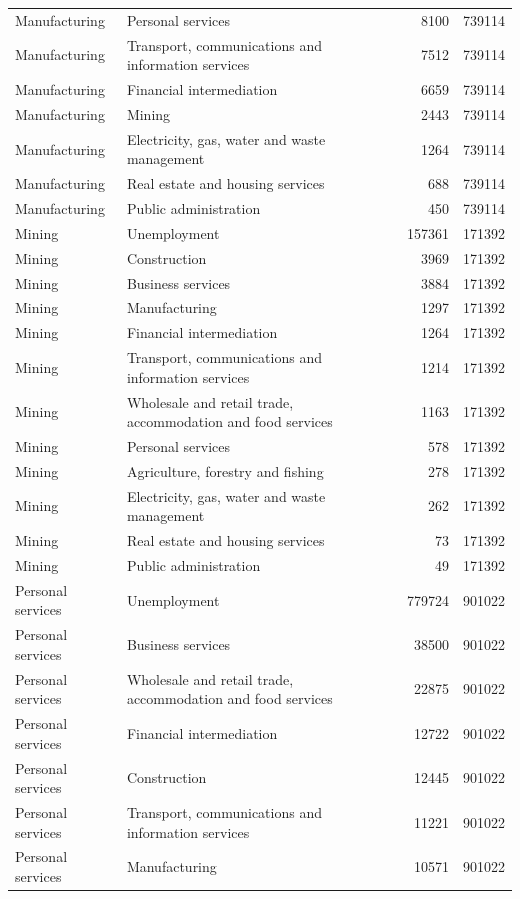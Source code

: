 \begin{longtable}{llrr}
Manufacturing & Personal services & 8100 & 739114 \\
Manufacturing & Transport, communications and information services & 7512 & 739114 \\
Manufacturing & Financial intermediation & 6659 & 739114 \\
Manufacturing & Mining & 2443 & 739114 \\
Manufacturing & Electricity, gas, water and waste management & 1264 & 739114 \\
Manufacturing & Real estate and housing services & 688 & 739114 \\
Manufacturing & Public administration & 450 & 739114 \\
Mining & Unemployment & 157361 & 171392 \\
Mining & Construction & 3969 & 171392 \\
Mining & Business services & 3884 & 171392 \\
Mining & Manufacturing & 1297 & 171392 \\
Mining & Financial intermediation & 1264 & 171392 \\
Mining & Transport, communications and information services & 1214 & 171392 \\
Mining & Wholesale and retail trade, accommodation and food services & 1163 & 171392 \\
Mining & Personal services & 578 & 171392 \\
Mining & Agriculture, forestry and fishing & 278 & 171392 \\
Mining & Electricity, gas, water and waste management & 262 & 171392 \\
Mining & Real estate and housing services & 73 & 171392 \\
Mining & Public administration & 49 & 171392 \\
Personal services & Unemployment & 779724 & 901022 \\
Personal services & Business services & 38500 & 901022 \\
Personal services & Wholesale and retail trade, accommodation and food services & 22875 & 901022 \\
Personal services & Financial intermediation & 12722 & 901022 \\
Personal services & Construction & 12445 & 901022 \\
Personal services & Transport, communications and information services & 11221 & 901022 \\
Personal services & Manufacturing & 10571 & 901022 \\

\end{longtable}
